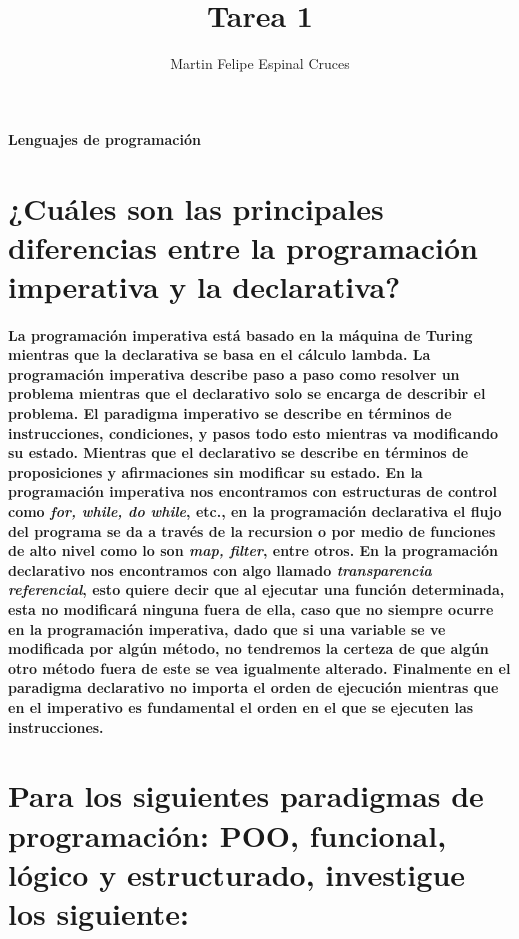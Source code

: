 \documentclass[10pt]{article}
\author{Martin Felipe Espinal Cruces}
\title{Tarea 1}
\begin{document}
\maketitle{}

\paragraph{Lenguajes de programación}

\section{\normalsize ¿Cuáles son las principales diferencias entre la programación imperativa y la declarativa?}
\setlength{\parindent}{0pt}
\paragraph{La programación imperativa está basado en la máquina de Turing mientras que la declarativa se basa en el cálculo lambda.
La programación imperativa describe paso a paso como resolver un problema mientras que el declarativo solo se encarga de describir el problema.
El paradigma imperativo se describe en términos de instrucciones, condiciones, y pasos todo esto mientras va modificando su estado. Mientras que el declarativo se describe en términos de proposiciones y afirmaciones sin modificar su estado. En la programación imperativa nos encontramos con estructuras de control como \textit{for, while, do while}, etc., en la programación declarativa el flujo del programa se da a través de la recursion o por medio de funciones de alto nivel como lo son \textit{map, filter}, entre otros. En la programación declarativo nos encontramos con algo llamado \textit{transparencia referencial}, esto quiere decir que al ejecutar una función determinada, esta no modificará ninguna fuera de ella, caso que no siempre ocurre en la programación imperativa, dado que si una variable se ve modificada por algún método, no tendremos la certeza de que algún otro método fuera de este se vea igualmente alterado. Finalmente en el paradigma declarativo no importa el orden de ejecución mientras que en el imperativo es fundamental el orden en el que se ejecuten las instrucciones.}

\section{\normalsize Para los siguientes paradigmas de programación: POO, funcional, lógico y estructurado, investigue los siguiente:}
\end{document}
